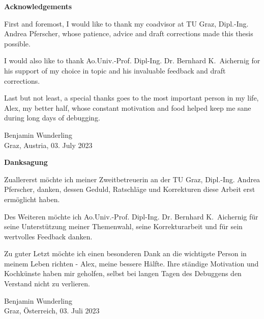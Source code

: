 



\begin{center}
{\Large\bfseries Acknowledgements}
\end{center}


\begin{changemargin}{1.5cm}{1.5cm}
First and foremost, I would like to thank my coadvisor at TU Graz, Dipl.-Ing. Andrea Pferscher, whose patience, advice and draft corrections made this thesis possible. 

I would also like to thank Ao.Univ.-Prof. Dipl-Ing. Dr. Bernhard K.~Aichernig for his support of my choice in topic and his invaluable feedback and draft corrections.

Last but not least, a special thanks goes to the most important person in my life, Alex, my better half, whose constant motivation and food helped keep me sane during long days of debugging.

\begin{flushright}
Benjamin Wunderling \\ {\small Graz, Austria, 03. July 2023}
\end{flushright}
\end{changemargin}


\newpage

\begin{center}
{\Large\bfseries Danksagung}

\end{center}

\begin{changemargin}{1.5cm}{1.5cm}
Zuallererst möchte ich meiner Zweitbetreuerin an der TU Graz, Dipl.-Ing. Andrea Pferscher, danken, dessen Geduld, Ratschläge und Korrekturen diese Arbeit erst ermöglicht haben.

Des Weiteren möchte ich Ao.Univ.-Prof. Dipl-Ing. Dr. Bernhard K.~Aichernig für seine Unterstützung meiner Themenwahl, seine Korrekturarbeit und für sein wertvolles Feedback danken.

Zu guter Letzt möchte ich einen besonderen Dank an die wichtigste Person in meinem Leben richten - Alex, meine bessere Hälfte. Ihre ständige Motivation und Kochkünste haben mir geholfen, selbst bei langen Tagen des Debuggens den Verstand nicht zu verlieren.
\begin{flushright}
Benjamin Wunderling \\ {\small Graz, \"Osterreich, 03. Juli 2023}
\end{flushright}
\end{changemargin}







